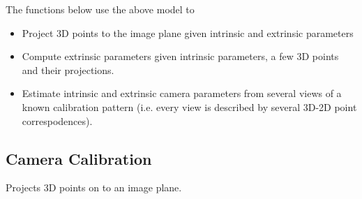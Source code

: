 The functions below use the above model to

\begin{itemize}
 \item Project 3D points to the image plane given intrinsic and extrinsic parameters
 \item Compute extrinsic parameters given intrinsic parameters, a few 3D points and their projections.
 \item Estimate intrinsic and extrinsic camera parameters from several views of a known calibration pattern (i.e. every view is described by several 3D-2D point correspodences).
\end{itemize}

\subsection{Camera Calibration}

\label{ProjectPoints2}

Projects 3D points on to an image plane.


